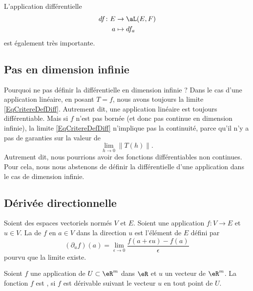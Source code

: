 L'application différentielle
\begin{equation}
	\begin{aligned}
		df\colon E & \to \aL(E,F) \\
		a          & \mapsto df_a
	\end{aligned}
\end{equation}
est également très importante.

\subsection{Pas en dimension infinie}

Pourquoi ne pas définir la différentielle en dimension infinie\cite{MonCerveau} ? Dans le cas d'une application linéaire, en posant \( T=f\), nous avons toujours la limite \eqref{EqCritereDefDiff}. Autrement dit, une application linéaire est toujours différentiable. Mais si \( f \) n'est pas bornée (et donc pas continue en dimension infinie), la limite \eqref{EqCritereDefDiff} n'implique pas la continuité, parce qu'il n'y a pas de garanties sur la valeur de
\begin{equation}
	\lim_{h\to 0}\| T(h) \|.
\end{equation}
Autrement dit, nous pourrions avoir des fonctions différentiables non continues. Pour cela, nous nous abstenons de définir la différentielle d'une application dans le cas de dimension infinie.

\subsection{Dérivée directionnelle}

\begin{definition}      \label{DEFooCATTooTPLtpR}
	Soient des espaces vectoriels normés \( V\) et \( E\). Soient une application \(f \colon V\to E  \) et \( u\in V\). La  de \( f\) en \( a\in V\) dans la direction \( u\) est l'élément de \( E\) défini par
	\begin{equation}
		(\partial_uf)(a)=\lim_{\epsilon\to 0}\frac{ f(a+\epsilon u)-f(a) }{ \epsilon }
	\end{equation}
	pourvu que la limite existe.

	Soient \( f\) une application de \( U\subset\eR^m\) dans \( \eR\) et \( u\) un vecteur de \( \eR^m\). La fonction \( f\) est , si \( f\) est dérivable  suivant le vecteur \( u\) en tout point de \( U\).
\end{definition}

